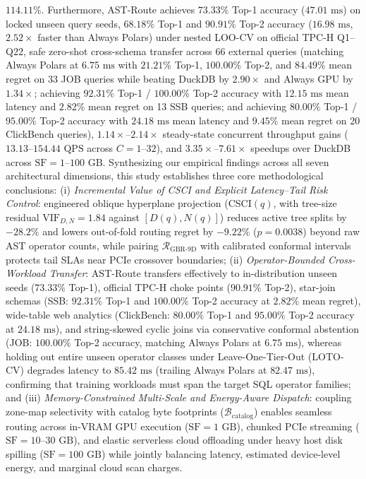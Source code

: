 \documentclass[10pt,a4paper]{article}
\begin{document}
$114.11\%$. Furthermore, AST-Route achieves $73.33\%$ Top-1 accuracy ($47.01\text{ ms}$) on locked unseen query seeds, $68.18\%$ Top-1 and $90.91\%$ Top-2 accuracy ($16.98\text{ ms}$, $2.52\times$ faster than Always Polars) under nested LOO-CV on official TPC-H Q1--Q22, safe zero-shot cross-schema transfer across 66 external queries (matching Always Polars at $6.75\text{ ms}$ with $21.21\%$ Top-1, $100.00\%$ Top-2, and $84.49\%$ mean regret on 33 JOB queries while beating DuckDB by $2.90\times$ and Always GPU by $1.34\times$; achieving $92.31\%$ Top-1 / $100.00\%$ Top-2 accuracy with $12.15\text{ ms}$ mean latency and $2.82\%$ mean regret on 13 SSB queries; and achieving $80.00\%$ Top-1 / $95.00\%$ Top-2 accuracy with $24.18\text{ ms}$ mean latency and $9.45\%$ mean regret on 20 ClickBench queries), $1.14\times\text{--}2.14\times$ steady-state concurrent throughput gains ($13.13\text{--}154.44\text{ QPS}$ across $C=1\text{--}32$), and $3.35\times\text{--}7.61\times$ speedups over DuckDB across $\text{SF}=1\text{--}100\text{ GB}$. Synthesizing our empirical findings across all seven architectural dimensions, this study establishes three core methodological conclusions: (i) \textit{Incremental Value of CSCI and Explicit Latency--Tail Risk Control}: engineered oblique hyperplane projection ($\text{CSCI}(q)$, with tree-size residual $\text{VIF}_{D,N}=1.84$ against $[D(q), N(q)]$) reduces active tree splits by $-28.2\%$ and lowers out-of-fold routing regret by $-9.22\%$ ($p=0.0038$) beyond raw AST operator counts, while pairing $\mathcal{R}_{\text{GBR-9D}}$ with calibrated conformal intervals protects tail SLAs near PCIe crossover boundaries; (ii) \textit{Operator-Bounded Cross-Workload Transfer}: AST-Route transfers effectively to in-distribution unseen seeds ($73.33\%$ Top-1), official TPC-H choke points ($90.91\%$ Top-2), star-join schemas (SSB: $92.31\%$ Top-1 and $100.00\%$ Top-2 accuracy at $2.82\%$ mean regret), wide-table web analytics (ClickBench: $80.00\%$ Top-1 and $95.00\%$ Top-2 accuracy at $24.18\text{ ms}$), and string-skewed cyclic joins via conservative conformal abstention (JOB: $100.00\%$ Top-2 accuracy, matching Always Polars at $6.75\text{ ms}$), whereas holding out entire unseen operator classes under Leave-One-Tier-Out (LOTO-CV) degrades latency to $85.42\text{ ms}$ (trailing Always Polars at $82.47\text{ ms}$), confirming that training workloads must span the target SQL operator families; and (iii) \textit{Memory-Constrained Multi-Scale and Energy-Aware Dispatch}: coupling zone-map selectivity with catalog byte footprints ($\mathcal{B}_{\text{catalog}}$) enables seamless routing across in-VRAM GPU execution ($\text{SF}=1\text{ GB}$), chunked PCIe streaming ($\text{SF}=10\text{--}30\text{ GB}$), and elastic serverless cloud offloading under heavy host disk spilling ($\text{SF}=100\text{ GB}$) while jointly balancing latency, estimated device-level energy, and marginal cloud scan charges.
\end{document}
